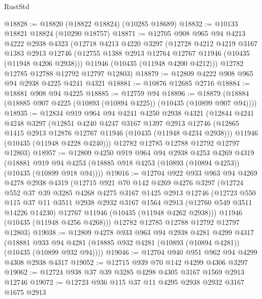 \begin{lexlean}{RustStd}
\begin{coremodule}
{\begin{coremodule}
{{{{{{{{{{{{{{{{{{{{{{{{{{{{{{{{{{{{{{{{{{{{{{{{{{{{{{{{{{{{{{{{{{{{{{{{{{{{{{@18828 := @18820 (@18822 @18824) (@10285 @18689)
@18832 := @10133 @18821 @18824 (@10290 @18757)
@18871 := @12705
    @908
    @965
    @94
    @4213
    @4222
    @2938
    @4323
    (@12718
      @4213
      @4220
      @3297
      (@12728
        @4212
        @4219
        @3167
        @1383
        @2913
        @12746
        (@12755 @1388 @2913 @12764 @12767 @11946 (@10435 (@11948 @4206 @2938)))
        @11946
        (@10435 (@11948 @4200 @4212)))
      @12782
      @12785
      @12788
      @12792
      @12797
      @12803)
@18879 := @12809 @4222 @908 @965 @94 @2938 @4225 @4241 @4321
@18881 := @10876 @12685 @2716
@18884 := @18881 @908 @94 @4225
@18885 := @12759 @94
@18896 := @18879 (@18884 (@18885 @907 @4225 (@10893 (@10894 @4225)) (@10435 (@10899 @907 @94))))
@18935 := @12834
    @919
    @964
    @94
    @4241
    @4250
    @2938
    @4321
    (@12844
      @4241
      @4248
      @3297
      (@12851
        @4240
        @4247
        @3167
        @1397
        @2913
        @12746
        (@12865 @1415 @2913 @12876 @12767 @11946 (@10435 (@11948 @4234 @2938)))
        @11946
        (@10435 (@11948 @4228 @4240)))
      @12782
      @12785
      @12788
      @12792
      @12797
      @12803)
@18957 := @12809
    @4250
    @919
    @964
    @94
    @2938
    @4253
    @4269
    @4319
    (@18881 @919 @94 @4253 (@18885 @918 @4253 (@10893 (@10894 @4253)) (@10435 (@10899 @918 @94))))
@19016 := @12704
    @922
    @933
    @963
    @94
    @4269
    @4278
    @2938
    @4319
    (@12715
      @921
      @70
      @142
      @4269
      @4276
      @3297
      (@12724
        @552
        @37
        @39
        @3285
        @4268
        @4275
        @3167
        @1425
        @2913
        @12746
        (@12723
          @550
          @115
          @37
          @11
          @3511
          @2938
          @2932
          @3167
          @1564
          @2913
          (@12760 @549 @3511 @14226 @14230)
          @12767
          @11946
          (@10435 (@11948 @4262 @2938)))
        @11946
        (@10435 (@11948 @4256 @4268)))
      @12782
      @12785
      @12788
      @12792
      @12797
      @12803)
@19038 := @12809
    @4278
    @933
    @963
    @94
    @2938
    @4281
    @4299
    @4317
    (@18881 @933 @94 @4281 (@18885 @932 @4281 (@10893 (@10894 @4281)) (@10435 (@10899 @932 @94))))
@19046 := @12704 @940 @951 @962 @94 @4299 @4308 @2938 @4317
@19052 := @12715 @939 @70 @142 @4299 @4306 @3297
@19062 := @12724 @938 @37 @39 @3285 @4298 @4305 @3167 @1569 @2913 @12746
@19072 := @12723 @936 @115 @37 @11 @4295 @2938 @2932 @3167 @1675 @2913
}}}}}}}}}}}}}}}}}}}}}}}}}}}}}}}}}}}}}}}}}}}}}}}}}}}}}}}}}}}}}}}}}}}}}}}}}}}}}}
\end{coremodule}}
\end{coremodule}
\end{lexlean}

